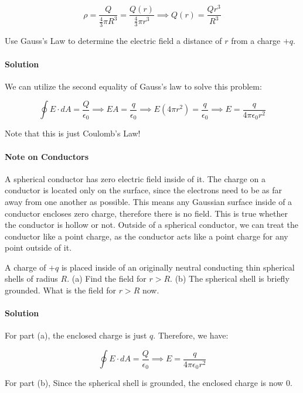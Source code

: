 \documentclass{scrartcl}
\theoremstyle{definition}
\begin{document}
	$$
	\rho = \frac{Q}{\frac{4}{3} \pi R^3} = \frac{Q(r)}{\frac{4}{3} \pi r^3} \implies Q(r) = \frac{Qr^3}{R^3}
	$$
	
	\begin{example}
		Use Gauss's Law to determine the electric field a distance of $r$ from a charge $+q$.
	\end{example}
	
	\paragraph{Solution} We can utilize the second equality of Gauss's law to solve this problem:
	
	$$
	\oint E \cdot dA = \frac{Q}{\epsilon_0} \implies EA = \frac{q}{\epsilon_0} \implies E(4 \pi r^2) = \frac{q}{\epsilon_0} \implies E = \frac{q}{4 \pi \epsilon_0 r^2}
	$$
	
	\noindent Note that this is just Coulomb's Law!
	
	\paragraph{Note on Conductors} A spherical conductor has zero electric field inside of it. The charge on a conductor is located only on the surface, since the electrons need to be as far away from one another as possible. This means any Gaussian surface inside of a conductor encloses zero charge, therefore there is no field. This is true whether the conductor is hollow or not. Outside of a spherical conductor, we can treat the conductor like a point charge, as the conductor acts like a point charge for any point outside of it.
	
	\begin{example}
		A charge of $+q$ is placed inside of an originally neutral conducting thin spherical shells of radius $R$. (a) Find the field for $r > R$. (b) The spherical shell is briefly grounded. What is the field for $r > R$ now.
	\end{example}
	
	\paragraph{Solution} For part (a), the enclosed charge is just $q$. Therefore, we have:
	
	$$
	\oint E \cdot dA = \frac{Q}{\epsilon_0} \implies E = \frac{q}{4 \pi \epsilon_0 r^2}
	$$
	
	\noindent For part (b), Since the spherical shell is grounded, the enclosed charge is now 0.
	
\end{document}
